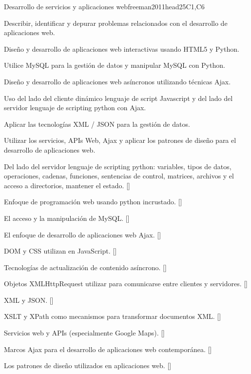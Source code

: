 \begin{syllabus}
\begin{unit}{Desarrollo de servicios y aplicaciones web}{}{freeman2011head}{25}{C1,C6}
   \begin{topics}
    \item Describir, identificar y depurar problemas relacionados con el desarrollo de aplicaciones web.
    \item Diseño y desarrollo de aplicaciones web interactivas usando HTML5 y Python.
    \item Utilice MySQL para la gestión de datos y manipular MySQL con Python.
    \item Diseño y desarrollo de aplicaciones web asíncronos utilizando técnicas Ajax.
    \item Uso del lado del cliente dinámico lenguaje de script Javascript y del lado del servidor lenguaje de scripting python con Ajax.
    \item Aplicar las tecnologías XML / JSON para la gestión de datos.
    \item Utilizar los servicios, APIs Web, Ajax y aplicar los patrones de diseño para el desarrollo de aplicaciones web.
   \end{topics}
   \begin{learningoutcomes}
      \item Del lado del servidor lenguaje de scripting python: variables, tipos de datos, operaciones, cadenas,
            funciones, sentencias de control, matrices, archivos y el acceso a directorios, mantener el estado. [\Usage]
      \item Enfoque de programación web usando python incrustado. [\Usage]
      \item El acceso y la manipulación de MySQL. [\Usage]
      \item El enfoque de desarrollo de aplicaciones web Ajax. [\Usage]
      \item DOM y CSS utilizan en JavaScript. [\Usage]
      \item Tecnologías de actualización de contenido asíncrono. [\Usage]
      \item Objetos XMLHttpRequest utilizar para comunicarse entre clientes y servidores. [\Usage]
      \item XML y JSON. [\Usage]
      \item XSLT y XPath como mecanismos para transformar documentos XML. [\Usage]
      \item Servicios web y APIs (especialmente Google Maps). [\Usage]
      \item Marcos Ajax para el desarrollo de aplicaciones web contemporánea. [\Usage]
      \item Los patrones de diseño utilizados en aplicaciones web. [\Usage]
   \end{learningoutcomes}
\end{unit}


\end{syllabus}
